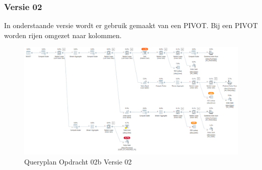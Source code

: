 \subsubsection{Versie 02}
In onderstaande versie wordt er gebruik gemaakt van een PIVOT. Bij een PIVOT worden rijen omgezet naar kolommen.

\begin{figure}[H]
    \centering
    \includegraphics[width=1\textwidth]{image/marc/opdracht-02b.PNG}
    \caption{Queryplan Opdracht 02b Versie 02}
\end{figure}

